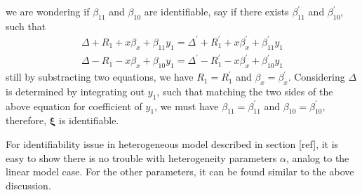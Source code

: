 \documentclass[12pt]{article}
\begin{document}
we are wondering if $\beta_{11}$ and $\beta_{10}$ are identifiable,
say if there exists $\beta_{11}^{'}$ and $\beta_{10}^{'}$, such that
\begin{align*}
  \Delta + R_1 + x\beta_x + \beta_{11}y_1 = \Delta^{'} + R_1^{'} + x\beta_{x}^{'} + \beta_{11}^{'}y_1\\
  \Delta - R_1 - x\beta_x + \beta_{10}y_1 = \Delta^{'} - R_1^{'} -
  x\beta_{x}^{'} + \beta_{10}^{'}y_1
\end{align*} 
still by substracting two equations, we have $R_1 = R_1^{'}$ and
$\beta_x = \beta_x^{'}$. Considering $\Delta$ is determined by
integrating out $y_1$, such that matching the two sides of the above
equation for coefficient of $y_1$, we must have $\beta_{11} =
\beta_{11}^{'}$ and $\beta_{10} = \beta_{10}^{'}$, therefore, $\bm
\xi$ is identifiable.

For identifiability issue in heterogeneous model described in section
[ref], it is easy to show there is no trouble with heterogeneity
parameters $\alpha$, analog to the linear model case. For the other
parameters, it can be found similar to the above discussion.
\end{document}

